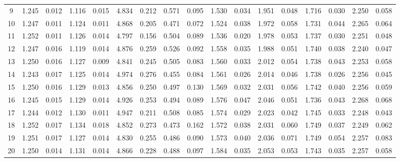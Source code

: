 \documentclass{article}
\begin{document}
\begin{table}[H]
{\begin{tabular}{|c|c|c|c|c|c|c|c|c|c|c|c|c|c|c|c|c|}
     9 & 1.245 & 0.012 & 1.116 & 0.015 & 4.834 & 0.212 & 0.571 & 0.095 & 1.530 & 0.034 & 1.951 & 0.048 & 1.716 & 0.030 & 2.250 & 0.058 \\ 
    10 & 1.247 & 0.011 & 1.124 & 0.011 & 4.868 & 0.205 & 0.471 & 0.072 & 1.524 & 0.038 & 1.972 & 0.058 & 1.731 & 0.044 & 2.265 & 0.064 \\ 
    11 & 1.252 & 0.011 & 1.126 & 0.014 & 4.797 & 0.156 & 0.504 & 0.089 & 1.536 & 0.020 & 1.978 & 0.053 & 1.737 & 0.030 & 2.251 & 0.048 \\ 
    12 & 1.247 & 0.016 & 1.119 & 0.014 & 4.876 & 0.259 & 0.526 & 0.092 & 1.558 & 0.035 & 1.988 & 0.051 & 1.740 & 0.038 & 2.240 & 0.047 \\ 
    13 & 1.250 & 0.016 & 1.127 & 0.009 & 4.841 & 0.245 & 0.505 & 0.083 & 1.560 & 0.033 & 2.012 & 0.054 & 1.738 & 0.043 & 2.253 & 0.058 \\ 
    14 & 1.243 & 0.017 & 1.125 & 0.014 & 4.974 & 0.276 & 0.455 & 0.084 & 1.561 & 0.026 & 2.014 & 0.046 & 1.738 & 0.026 & 2.256 & 0.045 \\ 
    15 & 1.250 & 0.016 & 1.129 & 0.013 & 4.856 & 0.250 & 0.497 & 0.130 & 1.569 & 0.032 & 2.031 & 0.056 & 1.742 & 0.040 & 2.256 & 0.059 \\ 
    16 & 1.245 & 0.015 & 1.129 & 0.014 & 4.926 & 0.253 & 0.494 & 0.089 & 1.576 & 0.047 & 2.046 & 0.051 & 1.736 & 0.043 & 2.268 & 0.068 \\ 
    17 & 1.244 & 0.012 & 1.130 & 0.011 & 4.947 & 0.211 & 0.508 & 0.085 & 1.574 & 0.029 & 2.023 & 0.042 & 1.745 & 0.033 & 2.248 & 0.043 \\ 
    18 & 1.252 & 0.017 & 1.134 & 0.018 & 4.852 & 0.273 & 0.473 & 0.162 & 1.572 & 0.038 & 2.031 & 0.060 & 1.749 & 0.037 & 2.249 & 0.062 \\ 
    19 & 1.251 & 0.017 & 1.127 & 0.014 & 4.830 & 0.255 & 0.486 & 0.090 & 1.573 & 0.040 & 2.036 & 0.071 & 1.749 & 0.054 & 2.257 & 0.083 \\ 
    20 & 1.250 & 0.014 & 1.131 & 0.014 & 4.866 & 0.228 & 0.488 & 0.097 & 1.584 & 0.035 & 2.053 & 0.053 & 1.743 & 0.035 & 2.257 & 0.058 \\ 
  \hline
 

\end{tabular}}
\end{table}
\end{document}
